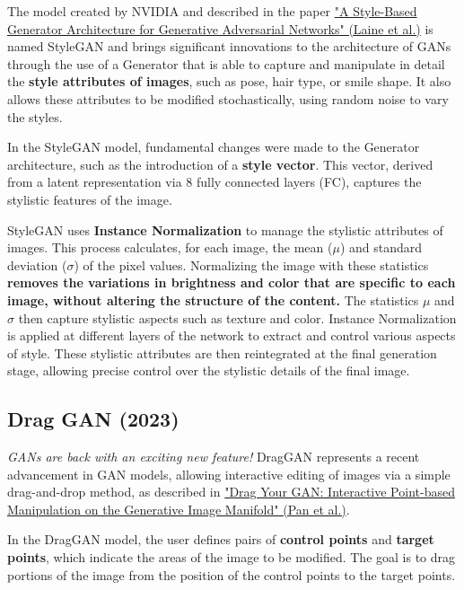 The model created by NVIDIA and described in the paper \href{https://arxiv.org/pdf/1812.04948}{"A Style-Based Generator Architecture for Generative Adversarial Networks" (Laine et al.)} is named StyleGAN and brings significant innovations to the architecture of GANs through the use of a Generator that is able to capture and manipulate in detail the \textbf{style attributes of images}, such as pose, hair type, or smile shape. It also allows these attributes to be modified stochastically, using random noise to vary the styles.

In the StyleGAN model, fundamental changes were made to the Generator architecture, such as the introduction of a \textbf{style vector}. This vector, derived from a latent representation via 8 fully connected layers (FC), captures the stylistic features of the image.

StyleGAN uses \textbf{Instance Normalization} to manage the stylistic attributes of images. This process calculates, for each image, the mean (\(\mu\)) and standard deviation (\(\sigma\)) of the pixel values. Normalizing the image with these statistics \textbf{removes the variations in brightness and color that are specific to each image, without altering the structure of the content.} The statistics \(\mu\) and \(\sigma\) then capture stylistic aspects such as texture and color. Instance Normalization is applied at different layers of the network to extract and control various aspects of style. These stylistic attributes are then reintegrated at the final generation stage, allowing precise control over the stylistic details of the final image.

\subsection{Drag GAN (2023)}

\textit{GANs are back with an exciting new feature!}  DragGAN represents a recent advancement in GAN models, allowing interactive editing of images via a simple drag-and-drop method, as described in \href{https://vcai.mpi-inf.mpg.de/projects/DragGAN/}{"Drag Your GAN: Interactive Point-based Manipulation on the Generative Image Manifold" (Pan et al.)}.

In the DragGAN model, the user defines pairs of \textbf{control points} and \textbf{target points}, which indicate the areas of the image to be modified. The goal is to drag portions of the image from the position of the control points to the target points.

